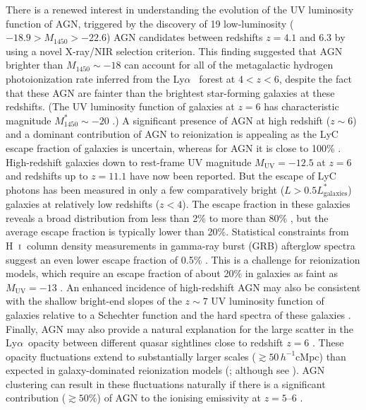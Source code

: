 \documentclass[fleqn,usenatbib]{mnras}
\def\lya{Ly$\alpha$~}
\def\HI{\hbox{H~$\scriptstyle\rm I$}}
\begin{document}
There is a renewed interest in understanding the evolution of the UV
luminosity function of AGN, triggered by the discovery of 19
low-luminosity ($-18.9>M_{1450}>-22.6$) AGN candidates between
redshifts $z=4.1$ and $6.3$ by \citet{2015AA...578A..83G} using a
novel X-ray/NIR selection criterion.  This finding suggested that AGN
brighter than $M_{1450}\sim -18$ can account for all of the
metagalactic hydrogen photoionization rate inferred from the \lya
forest at $4<z<6$, despite the fact that these AGN are fainter than
the brightest star-forming galaxies at these redshifts.  (The UV
luminosity function of galaxies at $z=6$ has characteristic magnitude
$M^*_{1450}\sim -20$ \citep{2015ApJ...803...34B}.)  A significant
presence of AGN at high redshift ($z\sim 6$) and a dominant
contribution of AGN to reionization is appealing as the LyC escape
fraction of galaxies is uncertain, whereas for AGN it is close to
100\% \citep{2014ApJ...794...75S, 2015MNRAS.449.4204L,
  2016A&A...585A..48G}.  High-redshift galaxies down to rest-frame UV
magnitude $M_\mathrm{UV}=-12.5$ at $z=6$ \citep{2017ApJ...835..113L}
and redshifts up to $z=11.1$ \citep{2016ApJ...819..129O} have now been
reported.  But the escape of LyC photons has been measured in only a
few comparatively bright ($L>0.5L^*_\mathrm{galaxies}$) galaxies at
relatively low redshifts ($z < 4$).  The escape fraction in these
galaxies reveals a broad distribution from less than 2\% to more than
80\% \citep{2010ApJ...725.1011V, 2014Sci...346..216B,
  2015ApJ...810..107M, 2016A&A...585A..48G, 2016Natur.529..178I,
  2016ApJ...826L..24S, 2017MNRAS.468..389J, 2018arXiv180506071S,
  2018arXiv180601741F, 2018arXiv180511621M, 2018arXiv180303655C,
  2018MNRAS.478.4851I, 2018MNRAS.474.4514I}, but the average escape
fraction is typically lower than 20\%.  Statistical constraints from
\HI\ column density measurements in gamma-ray burst (GRB) afterglow
spectra suggest an even lower escape fraction of 0.5\%
\citep{2007ApJ...667L.125C, 2009ApJS..185..526F, 2018arXiv180507318T}.
This is a challenge for reionization models, which require an escape
fraction of about 20\% in galaxies as faint as $M_\mathrm{UV}=-13$
\citep{2016PASA...33...37F, 2015ApJ...802L..19R, 2016MNRAS.457.4051K}.
An enhanced incidence of high-redshift AGN may also be consistent with
the shallow bright-end slopes of the $z\sim 7$ UV luminosity function
of galaxies relative to a Schechter function
\citep{2012MNRAS.426.2772B, 2014MNRAS.440.2810B, 2014ApJ...792...76B,
  2015MNRAS.452.1817B} and the hard spectra of these galaxies
\citep{2015MNRAS.450.1846S, 2015MNRAS.454.1393S, 2017MNRAS.464..469S,
  2017ApJ...851...40L}.  Finally, AGN may also provide a natural
explanation for the large scatter in the \lya opacity between
different quasar sightlines close to redshift $z=6$
\citep{2015MNRAS.447.3402B, 2018arXiv180208177B, 2018arXiv180704229E}.
These opacity fluctuations extend to substantially larger scales
($\gtrsim 50\, h^{-1}$cMpc) than expected in galaxy-dominated
reionization models (\citealt{2015MNRAS.453.2943C}; although see
\citealt{2016MNRAS.460.1328D, 2015ApJ...813L..38D,
  2018arXiv180308932B}).  AGN clustering can result in these
fluctuations naturally if there is a significant contribution
($\gtrsim 50\%$) of AGN to the ionising emissivity at $z=5$--$6$
\citep{2017MNRAS.465.3429C}.
\end{document}
